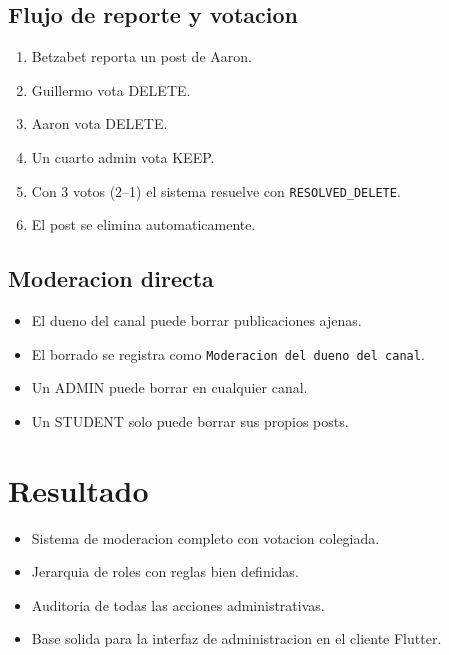\subsection{Flujo de reporte y votacion}

\begin{enumerate}[leftmargin=*]
  \item Betzabet reporta un post de Aaron.
  \item Guillermo vota DELETE.
  \item Aaron vota DELETE.
  \item Un cuarto admin vota KEEP.
  \item Con 3 votos (2--1) el sistema resuelve con \texttt{RESOLVED\_DELETE}.
  \item El post se elimina automaticamente.
\end{enumerate}

\subsection{Moderacion directa}

\begin{itemize}[leftmargin=*]
  \item El dueno del canal puede borrar publicaciones ajenas.
  \item El borrado se registra como \texttt{Moderacion del dueno del canal}.
  \item Un ADMIN puede borrar en cualquier canal.
  \item Un STUDENT solo puede borrar sus propios posts.
\end{itemize}

\section{Resultado}

\begin{exito}
\begin{itemize}[leftmargin=*]
  \item Sistema de moderacion completo con votacion colegiada.
  \item Jerarquia de roles con reglas bien definidas.
  \item Auditoria de todas las acciones administrativas.
  \item Base solida para la interfaz de administracion en el cliente Flutter.
\end{itemize}
\end{exito}